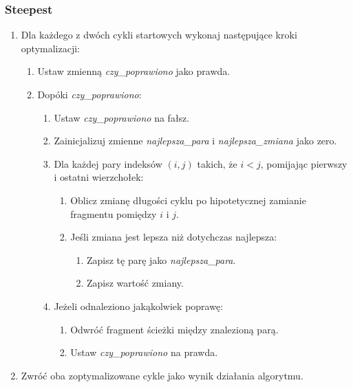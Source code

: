 \documentclass[11pt]{article}
\begin{document}
\subsubsection{Steepest}

\begin{enumerate}
    \item Dla każdego z dwóch cykli startowych wykonaj następujące kroki optymalizacji:
    \begin{enumerate}
        \item Ustaw zmienną \textit{czy\_poprawiono} jako prawda.
        \item Dopóki \textit{czy\_poprawiono}:
        \begin{enumerate}
            \item Ustaw \textit{czy\_poprawiono} na fałsz.
            \item Zainicjalizuj zmienne \textit{najlepsza\_para} i \textit{najlepsza\_zmiana} jako zero.
            \item Dla każdej pary indeksów $(i, j)$ takich, że $i < j$, pomijając pierwszy i ostatni wierzchołek:
            \begin{enumerate}
                \item Oblicz zmianę długości cyklu po hipotetycznej zamianie fragmentu pomiędzy $i$ i $j$.
                \item Jeśli zmiana jest lepsza niż dotychczas najlepsza:
                \begin{enumerate}
                    \item Zapisz tę parę jako \textit{najlepsza\_para}.
                    \item Zapisz wartość zmiany.
                \end{enumerate}
            \end{enumerate}
            \item Jeżeli odnaleziono jakąkolwiek poprawę:
            \begin{enumerate}
                \item Odwróć fragment ścieżki między znalezioną parą.
                \item Ustaw \textit{czy\_poprawiono} na prawda.
            \end{enumerate}
        \end{enumerate}
    \end{enumerate}
    \item Zwróć oba zoptymalizowane cykle jako wynik działania algorytmu.
\end{enumerate}
\end{document}
